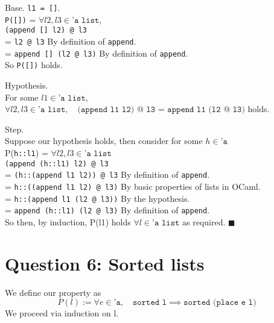 \documentclass{article}
\begin{document}
\bigskip

\noindent
Base. \texttt{l1 = []}. \\
\indent \texttt{P([])} = $\forall l2,l3 \in \texttt{'a list}$, \\
\indent \texttt{(append [] l2) @ l3} \\
\indent = \texttt{l2 @ l3} \qquad By definition of \texttt{append}. \\
\indent = \texttt{append [] (l2 @ l3)} \qquad By definition of \texttt{append}. \\
\noindent So \texttt{P([])} holds.

\bigskip

\noindent
Hypothesis. \\
\indent For some $l1 \in \texttt{'a list}$, $\forall l2,l3 \in \texttt{'a list}, \quad \texttt{(append l1 l2) @ l3 = append l1 (l2 @ l3)}$ holds.

\bigskip

\noindent
Step. \\
Suppose our hypothesis holds, then consider for some $h \in \texttt{'a}$ \\
\indent P(\texttt{h::l1}) = $\forall l2,l3 \in \texttt{'a list}$ \\
\indent \texttt{(append (h::l1) l2) @ l3} \\
\indent = \texttt{(h::(append l1 l2)) @ l3} \qquad By definition of \texttt{append}. \\
\indent = \texttt{h::((append l1 l2) @ l3)} \qquad By basic properties of lists in OCaml. \\
\indent = \texttt{h::(append l1 (l2 @ l3))} \qquad By the hypothesis. \\
\indent = \texttt{append (h::l1) (l2 @ l3)} \qquad By definition of \texttt{append}. \\
\noindent So then, by induction, P(l1) holds $\forall l \in \texttt{'a list}$ as
required. $\blacksquare$




\newpage




\section{Question 6: Sorted lists}
We define our property as
\[ P(l) := \forall e \in \texttt{'a}, \quad \texttt{sorted l} \implies \texttt{sorted (place e l)} \]
We proceed via induction on l.

\bigskip
\end{document}
